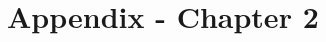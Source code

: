 \documentclass[a4paper,12pt,oneside]{memoir}
\begin{document}
  \section{Appendix - Chapter 2}
  
  
\endgroup
\backmatter
%

\clearpage
{}


\end{document}
